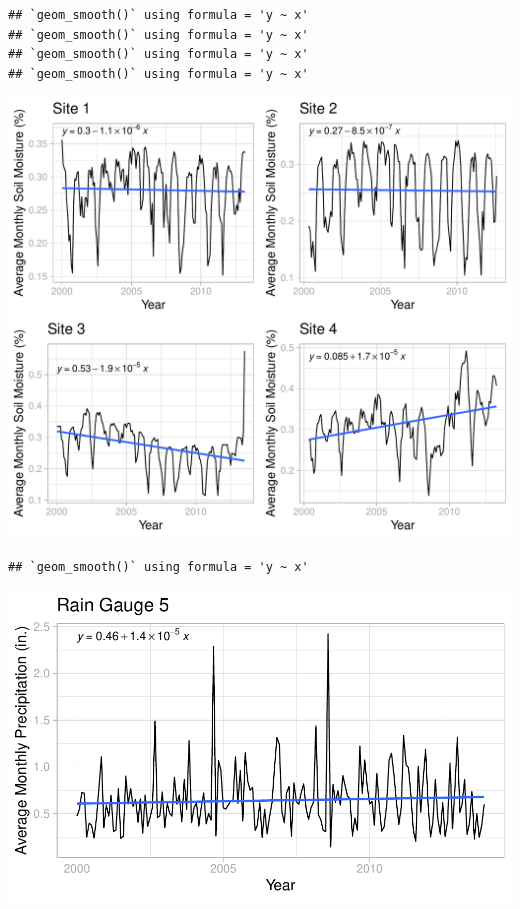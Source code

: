 \documentclass[
  12pt,
]{article}
\begin{document}
\begin{verbatim}
## `geom_smooth()` using formula = 'y ~ x'
## `geom_smooth()` using formula = 'y ~ x'
## `geom_smooth()` using formula = 'y ~ x'
## `geom_smooth()` using formula = 'y ~ x'
\end{verbatim}

\includegraphics{Project_Template_files/figure-latex/Average Monthly Soil Moisture Cowplot-1.pdf}

\begin{verbatim}
## `geom_smooth()` using formula = 'y ~ x'
\end{verbatim}

\includegraphics{Project_Template_files/figure-latex/Average Monthly Precipitation Plots-1.pdf}
\end{document}
